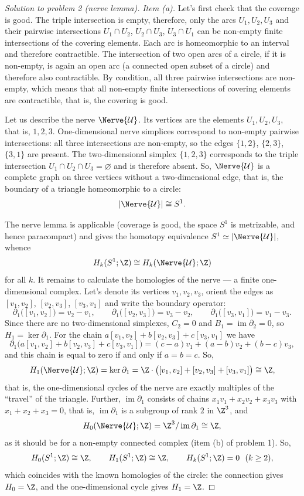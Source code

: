 \documentclass[a4paper,12pt]{report}
\begin{document}
\begin{proof}[Solution to problem \textup{2} \textup{(}nerve lemma\textup{)}]
\textit{Item \textup{(a)}.} Let's first check that the coverage is good. The triple intersection is empty, therefore, only the arcs $U_1,U_2,U_3$ and their pairwise intersections $U_1\cap U_2$, $U_2\cap U_3$, $U_3\cap U_1$ can be non-empty finite intersections of the covering elements. Each arc is homeomorphic to an interval and therefore contractible. The intersection of two open arcs of a circle, if it is non-empty, is again an open arc \textup{(}a connected open subset of a circle\textup{)} and therefore also contractible. By condition, all three pairwise intersections are non-empty, which means that all non-empty finite intersections of covering elements are contractible, that is, the covering is good.

Let us describe the nerve $\Nerve{\mathcal U}$. Its vertices are the elements $U_1,U_2,U_3$, that is, $1,2,3$. One-dimensional nerve simplices correspond to non-empty pairwise intersections: all three intersections are non-empty, so the edges $\{1,2\}$, $\{2,3\}$, $\{3,1\}$ are present. The two-dimensional simplex $\{1,2,3\}$ corresponds to the triple intersection $U_1\cap U_2\cap U_3=\varnothing$ and is therefore absent. So, $\Nerve{\mathcal U}$ is a complete graph on three vertices without a two-dimensional edge, that is, the boundary of a triangle homeomorphic to a circle:
\[
|\Nerve{\mathcal U}|\cong S^1 .
\]

The nerve lemma is applicable \textup{(}coverage is good, the space $S^1$ is metrizable, and hence paracompact\textup{)} and gives the homotopy equivalence $S^1\simeq|\Nerve{\mathcal U}|$, whence
\[
H_k(S^1;\Z)\cong H_k(\Nerve{\mathcal U};\Z)
\]
for all $k$. It remains to calculate the homologies of the nerve --- a finite one-dimensional complex. Let's denote its vertices $v_1,v_2,v_3$, orient the edges as $[v_1,v_2]$, $[v_2,v_3]$, $[v_3,v_1]$ and write the boundary operator:
\[
\partial_1\bigl([v_1,v_2]\bigr)=v_2-v_1,\qquad
\partial_1\bigl([v_2,v_3]\bigr)=v_3-v_2,\qquad
\partial_1\bigl([v_3,v_1]\bigr)=v_1-v_3 .
\]
Since there are no two-dimensional simplexes, $C_2=0$ and $B_1=\operatorname{im}\partial_2=0$, so $H_1=\ker\partial_1$. For the chain $a[v_1,v_2]+b[v_2,v_3]+c[v_3,v_1]$ we have
\[
\partial_1\bigl(a[v_1,v_2]+b[v_2,v_3]+c[v_3,v_1]\bigr)=(c-a)v_1+(a-b)v_2+(b-c)v_3 ,
\]
and this chain is equal to zero if and only if $a=b=c$. So,
\[
H_1(\Nerve{\mathcal U};\Z)=\ker\partial_1=\Z\cdot\bigl([v_1,v_2]+[v_2,v_3]+[v_3,v_1]\bigr)\cong\Z ,
\]
that is, the one-dimensional cycles of the nerve are exactly multiples of the ``travel'' of the triangle. Further, $\operatorname{im}\partial_1$ consists of chains $x_1v_1+x_2v_2+x_3v_3$ with $x_1+x_2+x_3=0$, that is, $\operatorname{im}\partial_1$ is a subgroup of rank $2$ in $\Z^3$, and
\[
H_0(\Nerve{\mathcal U};\Z)=\Z^3/\operatorname{im}\partial_1\cong\Z ,
\]
as it should be for a non-empty connected complex \textup{(}item \textup{(b)} of problem \textup{1}\textup{)}. So,
\[
H_0(S^1;\Z)\cong\Z,\qquad H_1(S^1;\Z)\cong\Z,\qquad H_k(S^1;\Z)=0\ \ (k\ge2),
\]
which coincides with the known homologies of the circle: the connection gives $H_0=\Z$, and the one-dimensional cycle gives $H_1=\Z$.


\end{proof}
\end{document}
